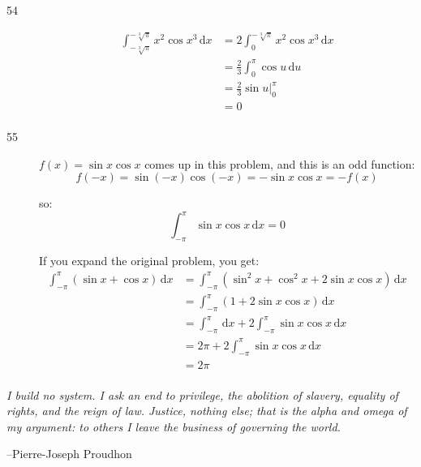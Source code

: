 \documentclass{exam}
\begin{document}
\begin{description}
\item[54]
\begin{align*}
  \int_{-\sqrt[3]{\pi}}^{-\sqrt[3]{\pi}} x^2 \cos x^3 \, \mathrm{d}x &= 2 \int_0^{-\sqrt[3]{\pi}} x^2 \cos x^3 \, \mathrm{d}x \\
  &= \frac{2}{3} \int_0^{\pi} \cos u \, \mathrm{d}u \\
  &= \frac{2}{3} \sin u \bigg|_0^{\pi} \\
  &= 0 \\
\end{align*}

\item[55]
$f(x) = \sin x \cos x$ comes up in this problem, and this is an odd function:
\[
  f(-x) = \sin(-x) \cos(-x) = - \sin x \cos x = - f(x)
\]

so:
\[
  \int_{-\pi}^{\pi} \sin x \cos x \, \mathrm{d}x = 0
\]

If you expand the original problem, you get:
\begin{align*}
  \int_{-\pi}^{\pi} (\sin x + \cos x) \, \mathrm{d}x &= \int_{-\pi}^{\pi} (\sin^2 x + \cos^2 x + 2 \sin x \cos x) \, \mathrm{d}x \\
  &= \int_{-\pi}^{\pi} (1 + 2 \sin x \cos x) \, \mathrm{d}x \\
  &= \int_{-\pi}^{\pi} \, \mathrm{d}x + 2 \int_{-\pi}^{\pi} \sin x \cos x \, \mathrm{d}x \\
  &= 2 \pi + 2 \int_{-\pi}^{\pi} \sin x \cos x \, \mathrm{d}x \\
  &= 2 \pi \\
\end{align*}

\end{description}

\else

\vspace{8 cm}




{\em I build no system. I ask an end to privilege, the abolition of slavery, equality of rights, and the reign of
law. Justice, nothing else; that is the alpha and omega of my argument: to others I leave the business of governing the
world.}

\vspace{.2 cm}

\hspace{1 cm} --Pierre-Joseph Proudhon

\fi
\end{document}
